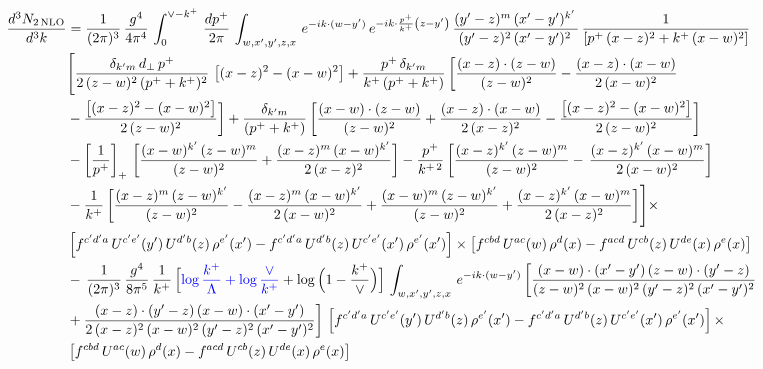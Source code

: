 \documentclass[9pt]{article}
\numberwithin{equation}{section}
\begin{document}
\begin{align}
 \frac{d^{3}N_{2\,\rm NLO}}{d^{3}k} & = \frac{1}{(2\pi)^{3}}\,\frac{g^{4}}{4\pi^{4}}\,\int_{0}^{\vee-k^{+}}\, \frac{dp^{+}}{2\pi}\,\int_{w,x',y',z,x}\, e^{-ik\cdot (w-y')}\,e^{-ik\cdot \frac{p^{+}}{k^{+}}\left(z-y'\right)}\, \frac{(y'-z)^{m}\,(x'-y')^{k'}\,}{(y'-z)^{2}\,(x'-y')^{2}\,}\, \frac{1}{\left[p^{+}\,(x-z)^{2}+k^{+}\,(x-w)^{2}\right]}\notag \\ & \Bigg[\frac{\delta_{k'm}\,d_{\perp}\,p^{+}}{2\,(z-w)^{2}\,(p^{+}+k^{+})^{2}}\, \left[(x-z)^{2}-(x-w)^{2}\right]+\frac{p^{+}\,\delta_{k'm}}{k^{+}\,(p^{+}+k^{+})}\,\bigg[\frac{(x-z)\cdot (z-w)}{(z-w)^{2}} -\frac{(x-z)\cdot (x-w)}{2\,(x-w)^{2}}\notag \\ & -\frac{\left[(x-z)^{2}-(x-w)^{2}\right]}{2\,(z-w)^{2}}\bigg] +\frac{\delta_{k'm}}{(p^{+}+k^{+})}\,\bigg[\frac{(x-w)\cdot (z-w)}{(z-w)^{2}}+\frac{(x-z)\cdot (x-w)}{2\,(x-z)^{2}} -\frac{\left[(x-z)^{2}-(x-w)^{2}\right]}{2\,(z-w)^{2}}\bigg]\notag \\ & -\left[\frac{1}{p^{+}}\right]_{+}\,\bigg[\frac{(x-w)^{k'}\,(z-w)^{m}}{(z-w)^{2}}+\frac{(x-z)^{m}\,(x-w)^{k'}}{2\,(x-z)^{2}}\bigg]-\frac{p^{+}}{k^{+\,2}}\,\bigg[\frac{(x-z)^{k'}\,(z-w)^{m}}{(z-w)^{2}} -\,\frac{(x-z)^{k'}\,(x-w)^{m}}{2\,(x-w)^{2}}\bigg]\notag \\ & -\frac{1}{k^{+}}\,\bigg[\frac{(x-z)^{m}\,(z-w)^{k'}}{(z-w)^{2}}-\frac{(x-z)^{m}\,(x-w)^{k'}}{2\,(x-w)^{2}}+\frac{(x-w)^{m}\,(z-w)^{k'}}{(z-w)^{2}} +\frac{(x-z)^{k'}\,(x-w)^{m}}{2\,(x-z)^{2}}\bigg]\Bigg]\times\,\notag \\ & \left[f^{c'd'a}\,U^{c'e'}(y')\,U^{d'b}(z)\,\rho^{e'}(x')-f^{c'd'a}\, 
    U^{d'b}(z)\,U^{c'e'}(x')\,\rho^{e'}(x')\right]\times \left[f^{cbd}\,U^{ac}(w)\,\rho^{d}(x) -f^{acd}\,U^{cb}(z)\,U^{de}(x)\,\rho^{e}(x)\right]\notag \\ &  -\, \frac{1}{(2\pi)^{3}}\,\frac{g^{4}}{8\pi^{5}}\,\frac{1}{k^{+}}\,\Big[{\color{blue}\log\frac{k^{+}}{\Lambda}+\log\frac{\vee}{k^{+}}}+\log\Big(1-\frac{k^{+}}{\vee}\Big)\Big]\,\int_{w,x',y',z,x}\, e^{-ik\cdot (w-y')}\,\bigg[\frac{(x-w)\cdot (x'-y')\,(z-w)\cdot (y'-z)}{(z-w)^{2}\,(x-w)^{2}\,(y'-z)^{2}\,(x'-y')^{2}}\notag \\ & +\frac{(x-z)\cdot (y'-z)\,(x-w)\cdot (x'-y')}{2\,(x-z)^{2}\,(x-w)^{2}\,(y'-z)^{2}\,(x'-y')^{2}}\bigg]\, \left[f^{c'd'a}\,U^{c'e'}(y')\,U^{d'b}(z)\,\rho^{e'}(x')-f^{c'd'a}\, 
    U^{d'b}(z)\,U^{c'e'}(x')\,\rho^{e'}(x')\right]\times\notag \\ &  \left[f^{cbd}\,U^{ac}(w)\,\rho^{d}(x) -f^{acd}\,U^{cb}(z)\,U^{de}(x)\,\rho^{e}(x)\right] 
\end{align}
\end{document}
